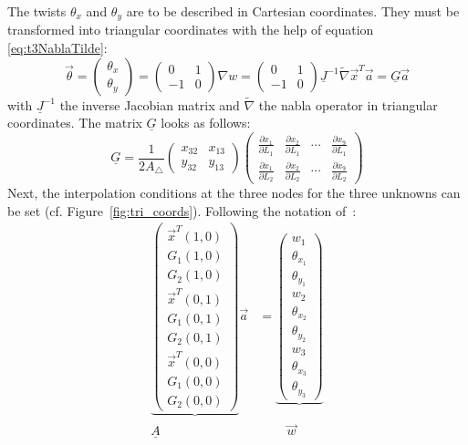   The twists $\theta_x$ and $\theta_y$ are to be described in Cartesian coordinates. They must be transformed into triangular coordinates with the help of equation \eqref{eq:t3NablaTilde}:
  \begin{equation}
  \vec{\theta} = \begin{pmatrix}
  \theta_x\\\theta_y
  \end{pmatrix} = \begin{pmatrix}
  0 & 1 \\ -1 & 0
  \end{pmatrix} \nabla w = \begin{pmatrix}
  0 & 1 \\ -1 & 0
  \end{pmatrix} \underline{J}^{-1} \tilde{\nabla} \vec{x}^T \vec{a} = \underline{G} \vec{a}
  \end{equation}
  with $\underline{J}^{-1}$ the inverse Jacobian matrix and $\tilde{\nabla}$ the nabla operator in triangular coordinates. The matrix $\underline{G}$ looks as follows:
  \begin{equation}
  \underline{G} = \frac{1}{2 A_\triangle} \begin{pmatrix}
  x_{32} & x_{13} \\ y_{32} & y_{13}
  \end{pmatrix} \begin{pmatrix}
  \frac{\partial x_1}{\partial L_1} & \frac{\partial x_2}{\partial L_1} & \cdots & \frac{\partial x_9}{\partial L_1} \\
  \frac{\partial x_1}{\partial L_2} & \frac{\partial x_2}{\partial L_2} & \cdots & \frac{\partial x_9}{\partial L_2}
  \end{pmatrix}
  \end{equation}
  Next, the interpolation conditions at the three nodes for the three unknowns can be set (cf. Figure~\ref{fig:tri_coords}). Following the notation of~\cite{steinke2005finite}:
  \begin{align}
  \underbrace{\begin{pmatrix}
  	\vec{x}^T(1,0)\\G_1(1,0)\\G_2(1,0)\\
  	\vec{x}^T(0,1)\\G_1(0,1)\\G_2(0,1)\\
  	\vec{x}^T(0,0)\\G_1(0,0)\\G_2(0,0)
  	\end{pmatrix}} \vec{a} &= \underbrace{\begin{pmatrix}
  	w_1\\\theta_{x_1}\\\theta_{y_1}\\
  	w_2\\\theta_{x_2}\\\theta_{y_2}\\
  	w_3\\\theta_{x_3}\\\theta_{y_3}
  	\end{pmatrix}}\\
  \underline{A}\qquad\quad &\qquad\ \vec{w}
  \end{align}
